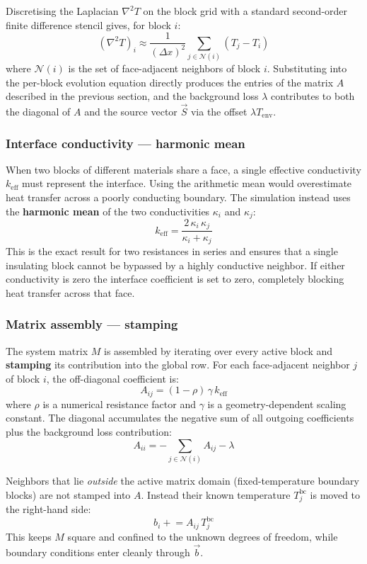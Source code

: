 \documentclass{report}
\begin{document}
Discretising the Laplacian $\nabla^2 T$ on the block grid with a standard second-order
finite difference stencil gives, for block $i$:
\[
(\nabla^2 T)_i \approx \frac{1}{(\Delta x)^2} \sum_{j \in \mathcal{N}(i)} (T_j - T_i)
\]
where $\mathcal{N}(i)$ is the set of face-adjacent neighbors of block $i$.
Substituting into the per-block evolution equation directly produces the entries of the
matrix $A$ described in the previous section, and the background loss $\lambda$ contributes
to both the diagonal of $A$ and the source vector $\vec{S}$ via the offset $\lambda T_{\text{env}}$.

\subsubsection*{Interface conductivity — harmonic mean}

When two blocks of different materials share a face, a single effective conductivity
$k_{\text{eff}}$ must represent the interface. Using the arithmetic mean would overestimate
heat transfer across a poorly conducting boundary. The simulation instead uses the
\textbf{harmonic mean} of the two conductivities $\kappa_i$ and $\kappa_j$:
\[
k_{\text{eff}} = \frac{2\,\kappa_i\,\kappa_j}{\kappa_i + \kappa_j}
\]
This is the exact result for two resistances in series and ensures that a single
insulating block cannot be bypassed by a highly conductive neighbor. If either
conductivity is zero the interface coefficient is set to zero, completely blocking
heat transfer across that face.

\subsubsection*{Matrix assembly — stamping}

The system matrix $M$ is assembled by iterating over every active block and
\textbf{stamping} its contribution into the global row. For each face-adjacent neighbor $j$
of block $i$, the off-diagonal coefficient is:
\[
A_{ij} = (1 - \rho)\,\gamma\, k_{\text{eff}}
\]
where $\rho$ is a numerical resistance factor and $\gamma$ is a geometry-dependent
scaling constant. The diagonal accumulates the negative sum of all outgoing coefficients
plus the background loss contribution:
\[
A_{ii} = -\sum_{j \in \mathcal{N}(i)} A_{ij} - \lambda
\]

Neighbors that lie \emph{outside} the active matrix domain (fixed-temperature boundary
blocks) are not stamped into $A$. Instead their known temperature $T_j^{\text{bc}}$ is
moved to the right-hand side:
\[
b_i \mathrel{+}= A_{ij}\, T_j^{\text{bc}}
\]
This keeps $M$ square and confined to the unknown degrees of freedom, while boundary
conditions enter cleanly through $\vec{b}$.
\end{document}
